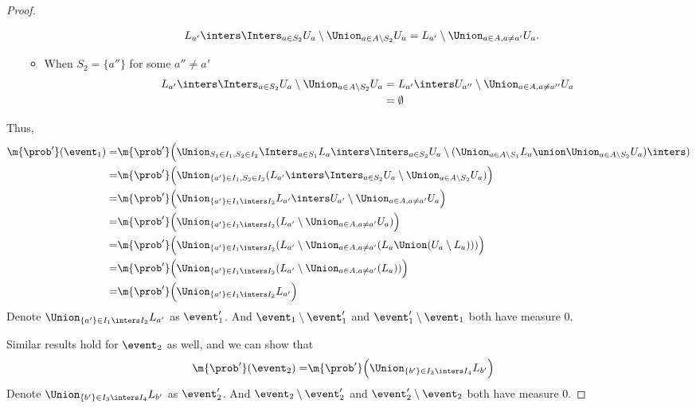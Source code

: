 \documentclass[acmsmall,nonacm,screen,appendix]{acmart}
\begin{document}
\begin{proof}
\begin{itemize}
\begin{itemize}
\begin{align*}
        L_{a'} \inters \Inters_{a \in S_2} U_a \setminus \Union_{a \in A \setminus S_2} U_a
        &= L_{a'} \setminus \Union_{a \in A, a \neq a'} U_a .
      \end{align*}
        \item
      When $S_2 = \{a''\}$ for some $a'' \neq a'$
      \begin{align*}
        L_{a'} \inters \Inters_{a \in S_2} U_a \setminus \Union_{a \in A \setminus S_2} U_a
        &= L_{a'} \inters U_{a''} \setminus \Union_{a \in A, a \neq a''} U_a \\
        &= \emptyset
      \end{align*}
      \end{itemize}
      \end{itemize}

Thus,
      \begin{align*}
         \m{\prob'}(\event_1)
        = & \m{\prob'}\Big(\Union_{S_1 \in I_1, S_2 \in I_2} \Inters_{a \in S_1} L_a \inters \Inters_{a \in S_2} U_a \setminus (\Union_{a \in A \setminus S_1} L_a \union \Union_{a \in A \setminus S_2} U_a) \inters) \\
          = & \m{\prob'}\Big(\Union_{\{a'\} \in I_1, S_2 \in I_2} ( L_{a'} \inters \Inters_{a \in S_2} U_a \setminus \Union_{a \in A \setminus S_2} U_a) \Big) \\
          = & \m{\prob'}\Big(\Union_{\{a'\} \in I_1 \inters I_2} L_{a'} \inters U_{a'} \setminus \Union_{a \in A, a \neq a'} U_a \Big)  \\
          = & \m{\prob'}\Big(\Union_{\{a'\} \in I_1 \inters I_2} ( L_{a'} \setminus \Union_{a \in A, a \neq a'} U_a )  \Big) \\
          = & \m{\prob'}\Big(\Union_{\{a'\} \in I_1 \inters I_2} ( L_{a'} \setminus \Union_{a \in A, a \neq a'} (L_a \Union (U_a \setminus L_a)) )  \Big) \\
          = & \m{\prob'}\Big(\Union_{\{a'\} \in I_1 \inters I_2} ( L_{a'} \setminus \Union_{a \in A, a \neq a'} (L_a ) ) \Big) \\
          = & \m{\prob'}\Big(\Union_{\{a'\} \in I_1 \inters I_2} L_{a'} \Big)
      \end{align*}
      Denote $\Union_{\{a'\} \in I_1 \inters I_2} L_{a'}$
      as $\event'_1$.
      And $\event_1 \setminus \event'_1$ and $\event'_1 \setminus \event_1$ both have measure 0.

      Similar results hold for $\event_2$ as well, and we can show that
      \begin{align*}
        \m{\prob'}(\event_2)
         = & \m{\prob'}\Big(\Union_{\{b'\} \in I_3 \inters I_4} L_{b'} \Big)
      \end{align*}
      Denote $\Union_{\{b'\} \in I_3 \inters I_4} L_{b'}$
      as $\event'_2$.
      And $\event_2 \setminus \event'_2$ and $\event'_2 \setminus \event_2$ both have measure 0.



\end{proof}
\end{document}

